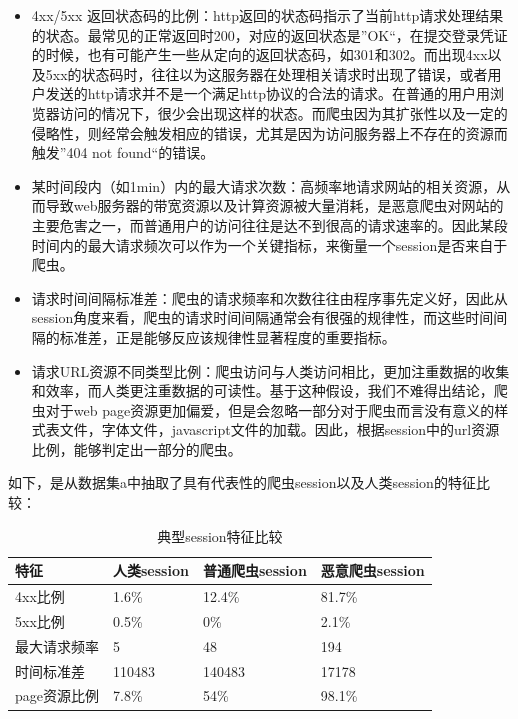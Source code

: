 \documentclass[doctor,privacy,twoside]{buaa_mac}
\begin{document}
\begin{itemize}
\item 4xx/5xx 返回状态码的比例：http返回的状态码指示了当前http请求处理结果的状态。最常见的正常返回时200，对应的返回状态是”OK“，在提交登录凭证的时候，也有可能产生一些从定向的返回状态码，如301和302。而出现4xx以及5xx的状态码时，往往以为这服务器在处理相关请求时出现了错误，或者用户发送的http请求并不是一个满足http协议的合法的请求。在普通的用户用浏览器访问的情况下，很少会出现这样的状态。而爬虫因为其扩张性以及一定的侵略性，则经常会触发相应的错误，尤其是因为访问服务器上不存在的资源而触发”404 not found“的错误。
\item 某时间段内（如1min）内的最大请求次数：高频率地请求网站的相关资源，从而导致web服务器的带宽资源以及计算资源被大量消耗，是恶意爬虫对网站的主要危害之一，而普通用户的访问往往是达不到很高的请求速率的。因此某段时间内的最大请求频次可以作为一个关键指标，来衡量一个session是否来自于爬虫。
\item 请求时间间隔标准差：爬虫的请求频率和次数往往由程序事先定义好，因此从session角度来看，爬虫的请求时间间隔通常会有很强的规律性，而这些时间间隔的标准差，正是能够反应该规律性显著程度的重要指标。
\item 请求URL资源不同类型比例：爬虫访问与人类访问相比，更加注重数据的收集和效率，而人类更注重数据的可读性。基于这种假设，我们不难得出结论，爬虫对于web page资源更加偏爱，但是会忽略一部分对于爬虫而言没有意义的样式表文件，字体文件，javascript文件的加载。因此，根据session中的url资源比例，能够判定出一部分的爬虫。
\end{itemize}

如下，是从数据集a中抽取了具有代表性的爬虫session以及人类session的特征比较：

\centerline{}
\begin{table}[h]
  \caption{典型session特征比较}
  \label{tab:papercomponents}
  \centering
\begin{tabular}{|p{3cm}<{\centering}||p{3cm}<{\centering}|p{3cm}<{\centering}|p{3cm}<{\centering}|}
    \hline
   特征 & 人类session & 普通爬虫session & 恶意爬虫session    \\
    \hline
4xx比例 & 1.6\% & 12.4\%  & 81.7\% \\
\hline
5xx比例 & 0.5\% & 0\% & 2.1\% \\
\hline
最大请求频率 & 5 & 48 & 194 \\
\hline
时间标准差 & 110483 & 140483 & 17178 \\
\hline
page资源比例 & 7.8\% & 54\% & 98.1\% \\

\hline
    \end{tabular}
\end{table}
\centerline{}
\end{document}
